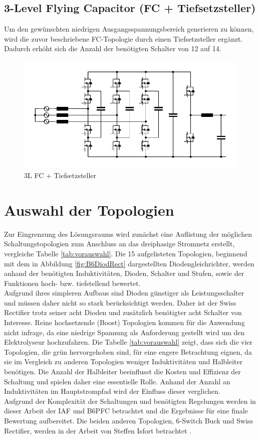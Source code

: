 	
	\subsection{3-Level Flying Capacitor (FC + Tiefsetzsteller)}
		Um den gewünschten niedrigen Ausgangsspannungsbereich generieren zu können, wird die zuvor beschriebene FC-Topologie durch einen Tiefsetzsteller ergänzt. Dadurch erhöht sich die Anzahl der benötigten Schalter von 12 auf 14.
		\begin{figure}
			\centering
			\includegraphics[width=1\linewidth]{content/Grafiken/3L-FC-Boost+Buck}
			\caption{3L FC + Tiefsetzsteller}
			\label{fig:3l-fc-boostbuck}
		\end{figure}

\section{Auswahl der Topologien}
Zur Eingrenzung des Lösungsraums wird zunächst eine Auflistung der möglichen Schaltungstopologien zum Anschluss an das dreiphasige Stromnetz erstellt, vergleiche Tabelle \ref{tab:vorauswahl}. Die 15 aufgelisteten Topologien, beginnend mit dem in Abbildung \ref{fig:B6DiodRect} dargestellten Diodengleichrichter, werden anhand der benötigten Induktivitäten, Dioden, Schalter und Stufen, sowie der Funktionen hoch- bzw. tiefstellend bewertet.\\
Aufgrund ihres simpleren Aufbaus sind Dioden günstiger als Leistungsschalter und müssen daher nicht so stark berücksichtigt werden. Daher ist der Swiss Rectifier trotz seiner acht Dioden und zusätzlich benötigter acht Schalter von Interesse. Reine hochsetzende (Boost) Topologien kommen für die Anwendung nicht infrage, da eine niedrige Spannung als Anforderung gestellt wird um den Elektrolyseur hochzufahren.
Die Tabelle \ref{tab:vorauswahl} zeigt, dass sich die vier Topologien, die grün hervorgehoben sind, für eine engere Betrachtung eignen, da sie im Vergleich zu anderen Topologien weniger Induktivitäten und Halbleiter benötigen. Die Anzahl der Halbleiter beeinflusst die Kosten und Effizienz der Schaltung und spielen daher eine essentielle Rolle. Anhand der Anzahl an Induktivitäten im Hauptstrompfad wird der Einfluss dieser verglichen. \\
Aufgrund der Komplexität der Schaltungen und benötigten Regelungen werden in dieser Arbeit der \gls{IAF} und \gls{B6PFC} betrachtet und die Ergebnisse für eine finale Bewertung aufbereitet. Die beiden anderen Topologien, 6-Switch Buck und Swiss Rectifier, werden in  der Arbeit von Steffen Isfort betrachtet \cite{Isfort}.

